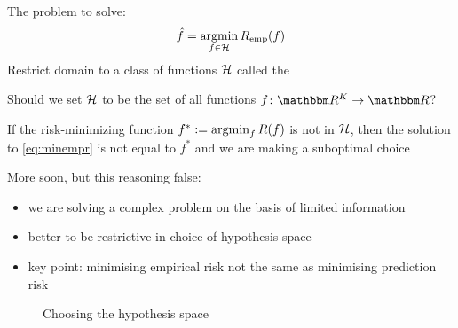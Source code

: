 \begin{frame}

    The problem to solve:
    \begin{equation}
        \label{eq:minempr}
        \hat f = \argmin_{f \in \hH} \Remp(f)
    \end{equation}
    Restrict domain to a class of functions $\mathcal H$ called the 
    
\end{frame}

\begin{frame}
    
    \vspace{2em}
    Should we set $\mathcal H$ to be the set of all
    functions $f \colon \RR^K \to \RR$?
    
    If the risk-minimizing
    function $f^* := \argmin_f R(f)$ is not in $\mathcal H$, 
    then the solution to \eqref{eq:minempr} is not equal
    to $f^*$ and we are making a suboptimal choice
    
    \vspace{.7em}
    More soon, but this reasoning false:
    \begin{itemize}
        \item  we are solving a complex problem on the basis of
    limited information
        \item better to be restrictive in choice of hypothesis space
        \item key point: minimising empirical risk not the same
        as minimising prediction risk
    \end{itemize}
    
\end{frame}

\begin{frame}

    \begin{figure}
       \begin{center}
            \caption{\label{f:circles} Choosing the hypothesis space}
       \end{center}
    \end{figure}
    
\end{frame}


